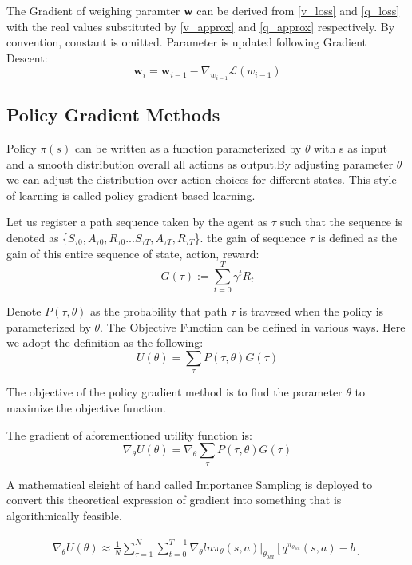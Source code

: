 \documentclass[journal]{IEEEtran}
\begin{document}
The Gradient of weighing paramter \textbf{w} can be derived from \ref{v_loss} and \ref{q_loss} with the real values substituted by \ref{v_approx} and \ref{q_approx} respectively. By convention, constant is omitted. Parameter is updated following Gradient Descent:
\begin{equation}
\textbf{w}_{i}=\textbf{w}_{i-1}-\nabla_{w_{i-1}} \mathcal{L}(w_{i-1})
\end{equation}
\subsection{Policy Gradient Methods}
Policy $\pi(s)$ can be written as a function parameterized by $\theta$ with s as input and a smooth distribution overall all actions as output.By adjusting parameter $\theta$ we can adjust the distribution over action choices for different states. This style of learning is called policy gradient-based learning.

Let us register a path sequence taken by the agent as $\tau$ such that the sequence is denoted as \{$S_{\tau 0},A_{\tau 0}, R_{\tau 0}...S_{\tau T},A_{\tau T},R_{\tau T}$\}. the gain of sequence $\tau$ is defined as the gain of this entire sequence of state, action, reward:
\begin{equation}
    G(\tau):=\displaystyle\sum_{t=0}^{T}\gamma^t R_t
\end{equation}

Denote $P(\tau,\theta)$ as the probability that path $\tau$ is travesed when the policy is parameterized by $\theta$. The Objective Function can be defined in various ways. Here we adopt the definition as the following:
\begin{equation}
    U(\theta)=\sum_{\tau}P(\tau,\theta)G(\tau)
\end{equation}


The objective of the policy gradient method is to find the parameter $\theta$ to maximize the objective function.

The gradient of aforementioned utility function is:
\begin{equation}
    \nabla_{\theta} U(\theta)= \nabla_{\theta}\sum_{\tau}P(\tau,\theta) G(\tau)
\end{equation}

A mathematical sleight of hand called Importance Sampling is deployed to convert this theoretical expression of gradient into something that is algorithmically feasible.

\begin{align}
\begin{split}
\nabla_{\theta} U(\theta) \approx \frac{1}{N}\displaystyle\sum_{\tau=1}^{N}\displaystyle\sum_{t=0}^{T-1} \nabla_{\theta}ln\pi_{\theta}(s,a)|_{\theta_{old}}[q^{\pi_{\theta_{old}}}(s,a)-b]\\
\end{split}
\end{align}
\end{document}
